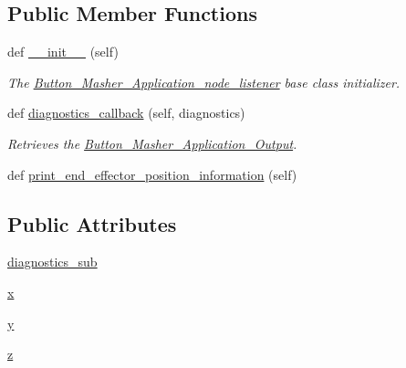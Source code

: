 \subsection*{Public Member Functions}
\begin{DoxyCompactItemize}
\item 
def \hyperlink{classButton__Masher__Application__Output_1_1Button__Masher__Application__node__listener_ae64f0875afe3067b97ba370b354b9213}{\+\_\+\+\_\+init\+\_\+\+\_\+} (self)
\begin{DoxyCompactList}\small\item\em The \hyperlink{classButton__Masher__Application__Output_1_1Button__Masher__Application__node__listener}{Button\+\_\+\+Masher\+\_\+\+Application\+\_\+node\+\_\+listener} base class initializer. \end{DoxyCompactList}\item 
def \hyperlink{classButton__Masher__Application__Output_1_1Button__Masher__Application__node__listener_ab3b9e5b2975cf90154645eee1c579708}{diagnostics\+\_\+callback} (self, diagnostics)
\begin{DoxyCompactList}\small\item\em Retrieves the \hyperlink{namespaceButton__Masher__Application__Output}{Button\+\_\+\+Masher\+\_\+\+Application\+\_\+\+Output}. \end{DoxyCompactList}\item 
def \hyperlink{classButton__Masher__Application__Output_1_1Button__Masher__Application__node__listener_a123cdc0332063476801ee93d615ea911}{print\+\_\+end\+\_\+effector\+\_\+position\+\_\+information} (self)
\end{DoxyCompactItemize}
\subsection*{Public Attributes}
\begin{DoxyCompactItemize}
\item 
\hyperlink{classButton__Masher__Application__Output_1_1Button__Masher__Application__node__listener_a547b75f681b266f91f9cc485c2f3b714}{diagnostics\+\_\+sub}
\item 
\hyperlink{classButton__Masher__Application__Output_1_1Button__Masher__Application__node__listener_a9336ebf25087d91c818ee6e9ec29f8c1}{x}
\item 
\hyperlink{classButton__Masher__Application__Output_1_1Button__Masher__Application__node__listener_a2fb1c5cf58867b5bbc9a1b145a86f3a0}{y}
\item 
\hyperlink{classButton__Masher__Application__Output_1_1Button__Masher__Application__node__listener_a25ed1bcb423b0b7200f485fc5ff71c8e}{z}
\end{DoxyCompactItemize}



